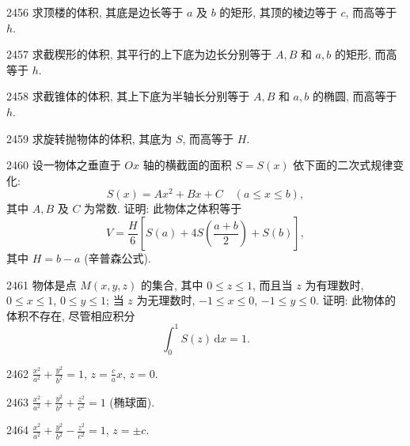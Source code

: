
\begin{prob}[M]{2456}
求顶楼的体积, 其底是边长等于 $a$ 及 $b$ 的矩形, 其顶的棱边等于 $c$, 而高等于 $h$.
\end{prob}

\begin{prob}[M]{2457}
求截楔形的体积, 其平行的上下底为边长分别等于 $A, B$ 和 $a, b$ 的矩形, 而高等于 $h$.
\end{prob}

\begin{prob}[M]{2458}
求截锥体的体积, 其上下底为半轴长分别等于 $A, B$ 和 $a, b$ 的椭圆, 而高等于 $h$.
\end{prob}

\begin{prob}[S]{2459}
求旋转抛物体的体积, 其底为 $S$, 而高等于 $H$.
\end{prob}

\begin{prob}[M]{2460}
设一物体之垂直于 $Ox$ 轴的横截面的面积 $S = S(x)$ 依下面的二次式规律变化:
\[
S(x) = Ax^2 + Bx + C \quad (a \leqslant x \leqslant b),
\]
其中 $A, B$ 及 $C$ 为常数. 证明: 此物体之体积等于
\[
V = \frac{H}{6}\left[S(a) + 4S\left(\frac{a+b}{2}\right) + S(b)\right],
\]
其中 $H = b - a$ (辛普森公式).
\end{prob}

\begin{prob}[M]{2461}
物体是点 $M(x, y, z)$ 的集合, 其中 $0 \leqslant z \leqslant 1$, 而且当 $z$ 为有理数时, $0 \leqslant x \leqslant 1$, $0 \leqslant y \leqslant 1$; 当 $z$ 为无理数时, $-1 \leqslant x \leqslant 0$, $-1 \leqslant y \leqslant 0$. 证明: 此物体的体积不存在, 尽管相应积分
\[
\int_0^1 S(z)\,\mathrm{d}x = 1.
\]
\end{prob}


\begin{prob}[S]{2462}
$\frac{x^2}{a^2} + \frac{y^2}{b^2} = 1$, $z = \frac{c}{a}x$, $z = 0$.
\end{prob}

\begin{prob}[S]{2463}
$\frac{x^2}{a^2} + \frac{y^2}{b^2} + \frac{z^2}{c^2} = 1$ (椭球面).
\end{prob}

\begin{prob}[S]{2464}
$\frac{x^2}{a^2} + \frac{y^2}{b^2} - \frac{z^2}{c^2} = 1$, $z = \pm c$.
\end{prob}

